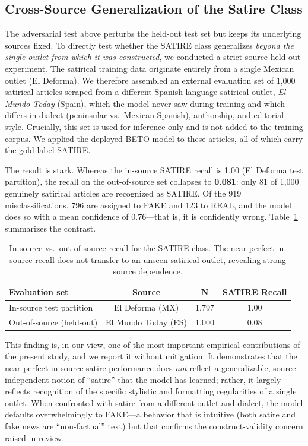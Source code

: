 \documentclass[informatics,article,submit,pdftex,moreauthors]{Definitions/mdpi}
\begin{document}
\subsection{Cross-Source Generalization of the Satire Class}\label{sec:cross-source}
The adversarial test above perturbs the held-out test set but keeps its underlying sources fixed. To directly test whether the SATIRE class generalizes \emph{beyond the single outlet from which it was constructed}, we conducted a strict source-held-out experiment. The satirical training data originate entirely from a single Mexican outlet (El Deforma). We therefore assembled an external evaluation set of 1{,}000 satirical articles scraped from a different Spanish-language satirical outlet, \textit{El Mundo Today} (Spain), which the model never saw during training and which differs in dialect (peninsular vs.\ Mexican Spanish), authorship, and editorial style. Crucially, this set is used for inference only and is not added to the training corpus. We applied the deployed BETO model to these articles, all of which carry the gold label SATIRE.

The result is stark. Whereas the in-source SATIRE recall is 1.00 (El Deforma test partition), the recall on the out-of-source set collapses to \textbf{0.081}: only 81 of 1{,}000 genuinely satirical articles are recognized as SATIRE. Of the 919 misclassifications, 796 are assigned to FAKE and 123 to REAL, and the model does so with a mean confidence of 0.76—that is, it is confidently wrong. Table~\ref{tab:cross_source} summarizes the contrast.

\begin{table}[H]
\centering
\caption{In-source vs.\ out-of-source recall for the SATIRE class. The near-perfect in-source recall does not transfer to an unseen satirical outlet, revealing strong source dependence.}
\label{tab:cross_source}
\begin{tabular}{lccc}
\toprule
\textbf{Evaluation set} & \textbf{Source} & \textbf{N} & \textbf{SATIRE Recall} \\
\midrule
In-source test partition  & El Deforma (MX)   & 1{,}797 & 1.00 \\
Out-of-source (held-out)   & El Mundo Today (ES) & 1{,}000 & 0.08 \\
\bottomrule
\end{tabular}
\end{table}

This finding is, in our view, one of the most important empirical contributions of the present study, and we report it without mitigation. It demonstrates that the near-perfect in-source satire performance does \emph{not} reflect a generalizable, source-independent notion of ``satire'' that the model has learned; rather, it largely reflects recognition of the specific stylistic and formatting regularities of a single outlet. When confronted with satire from a different outlet and dialect, the model defaults overwhelmingly to FAKE—a behavior that is intuitive (both satire and fake news are ``non-factual'' text) but that confirms the construct-validity concern raised in review.
\end{document}
